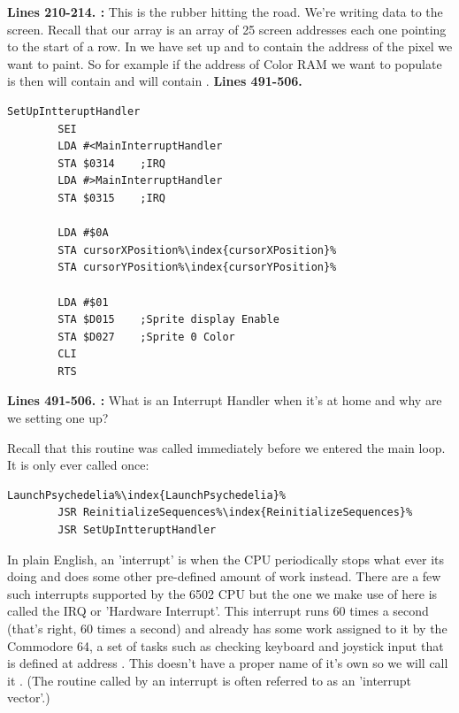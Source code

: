 \textbf{Lines 210-214. :} This is the rubber hitting the road. We're writing data to the
screen. Recall that our   array is an array of 25 screen addresses each one pointing
to the start of a row. In  we have set up  and  to contain the address of the pixel we want to paint. So for example if the address of Color RAM we want to populate
is  then  will contain  and  will
contain . 
\clearpage
\textbf{Lines 491-506. }
\begin{lstlisting}[caption= Setting up our Interrupt Handler,escapechar=\%]
SetUpIntteruptHandler   
        SEI 
        LDA #<MainInterruptHandler
        STA $0314    ;IRQ
        LDA #>MainInterruptHandler
        STA $0315    ;IRQ

        LDA #$0A
        STA cursorXPosition%\index{cursorXPosition}%
        STA cursorYPosition%\index{cursorYPosition}%

        LDA #$01
        STA $D015    ;Sprite display Enable
        STA $D027    ;Sprite 0 Color
        CLI 
        RTS 
\end{lstlisting}
\clearpage
{}
\textbf{Lines 491-506. :} What is an Interrupt Handler when it's at home and why are
we setting one up?

Recall that this routine was called immediately before we entered the main loop. It is only ever called once:
\begin{lstlisting}[escapechar=\%]
LaunchPsychedelia%\index{LaunchPsychedelia}%   
        JSR ReinitializeSequences%\index{ReinitializeSequences}%
        JSR SetUpIntteruptHandler
\end{lstlisting}

In plain English, an 'interrupt' is when the CPU periodically stops what ever its doing and does some other pre-defined amount
of work instead. There are a few such interrupts supported by the 6502 CPU but the one we make use of here is called the IRQ
or 'Hardware Interrupt'. This interrupt runs 60 times a second (that's right, 60 times a second) and already has some work
assigned to it by the Commodore 64, a set of tasks such as checking keyboard and joystick input that is defined at address .
This doesn't have a proper name of it's own so we will call it . (The routine called by an interrupt
is often referred to as an 'interrupt vector'.)

